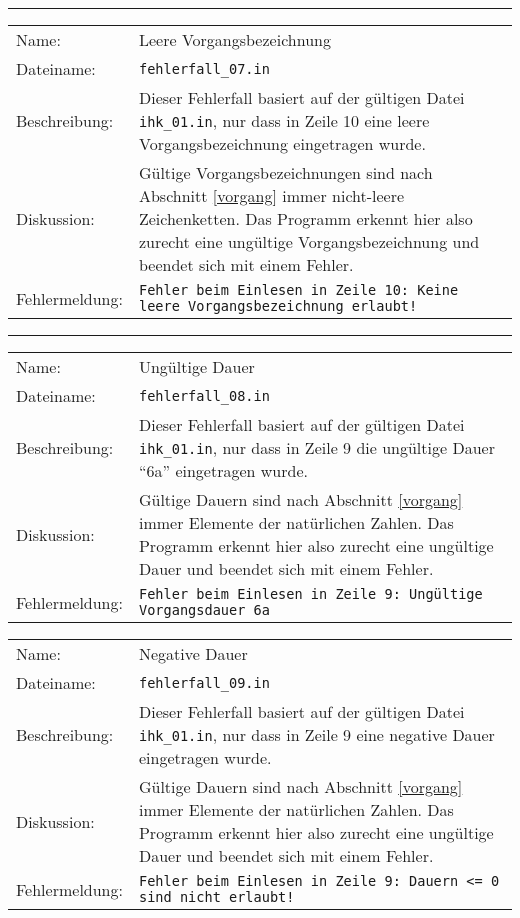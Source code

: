 \hrule
\begin{tabularx}{\textwidth}{l X}
  Name: & Leere Vorgangsbezeichnung \\
  Dateiname: & \texttt{fehlerfall\_07.in} \\
  Beschreibung: & Dieser Fehlerfall basiert auf der g\"ultigen Datei
  \texttt{ihk\_01.in}, nur dass in Zeile 10 eine leere
  Vorgangsbezeichnung eingetragen wurde. \\
  Diskussion: & G\"ultige Vorgangsbezeichnungen sind nach Abschnitt
  \ref{vorgang} immer nicht-leere Zeichenketten. Das Programm erkennt
  hier also zurecht eine ung\"ultige Vorgangsbezeichnung und beendet
  sich mit einem Fehler.\\
  Fehlermeldung: & \texttt{Fehler beim Einlesen in Zeile 10: Keine
    leere Vorgangsbezeichnung erlaubt!} \\
\end{tabularx}
\hrule
\begin{tabularx}{\textwidth}{l X}
  Name: & Ung\"ultige Dauer \\
  Dateiname: & \texttt{fehlerfall\_08.in} \\
  Beschreibung: & Dieser Fehlerfall basiert auf der g\"ultigen Datei
  \texttt{ihk\_01.in}, nur dass in Zeile 9 die ung\"ultige Dauer
  ``6a'' eingetragen wurde. \\
  Diskussion: & G\"ultige Dauern sind nach Abschnitt
  \ref{vorgang} immer Elemente der nat\"urlichen Zahlen. Das Programm
  erkennt hier also zurecht eine ung\"ultige Dauer und beendet
  sich mit einem Fehler.\\
  Fehlermeldung: & \texttt{Fehler beim Einlesen in Zeile 9: Ungültige Vorgangsdauer  6a} \\
\end{tabularx}
\begin{tabularx}{\textwidth}{l X}
  Name: & Negative Dauer \\
  Dateiname: & \texttt{fehlerfall\_09.in} \\
  Beschreibung: & Dieser Fehlerfall basiert auf der g\"ultigen Datei
  \texttt{ihk\_01.in}, nur dass in Zeile 9 eine negative Dauer
  eingetragen wurde. \\
  Diskussion: & G\"ultige Dauern sind nach Abschnitt
  \ref{vorgang} immer Elemente der nat\"urlichen Zahlen. Das Programm
  erkennt hier also zurecht eine ung\"ultige Dauer und beendet
  sich mit einem Fehler.\\
  Fehlermeldung: & \texttt{Fehler beim Einlesen in Zeile 9: Dauern <=
    0 sind nicht erlaubt!} \\
\end{tabularx}
